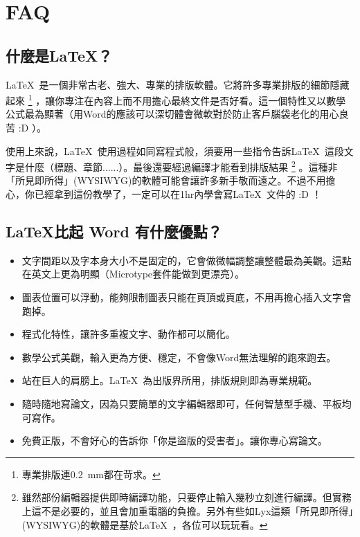 \documentclass[class=NCU_thesis, crop=false, float=true]{standalone}
\begin{document}
\let\orilabel\label %

\chapter{FAQ}
\label{sec:c_faq}
\section{什麼是\LaTeX ？}
\LaTeX\  是一個非常古老、強大、專業的排版軟體。它將許多專業排版的細節隱藏起來
\footnote{專業排版連\SI{0.2}{\milli\metre}都在苛求。}
，讓你專注在內容上而不用擔心最終文件是否好看。這一個特性又以數學公式最為顯著（用Word的應該可以深切體會微軟對於防止客戶腦袋老化的用心良苦 :D ）。

使用上來說，\LaTeX\ 使用過程如同寫程式般，須要用一些指令告訴\LaTeX\ 這段文字是什麼（標題、章節......）。最後還要經過編譯才能看到排版結果
\footnote{雖然部份編輯器提供即時編譯功能，只要停止輸入幾秒立刻進行編譯。但實務上這不是必要的，並且會加重電腦的負擔。另外有些如Lyx這類「所見即所得」(WYSIWYG)的軟體是基於\LaTeX\ ，各位可以玩玩看。}
。這種非「所見即所得」(WYSIWYG)的軟體可能會讓許多新手敬而遠之。不過不用擔心，你已經拿到這份教學了，一定可以在1hr內學會寫\LaTeX\ 文件的 :D ！

\section{\LaTeX 比起 Word 有什麼優點？}
\begin{itemize}
    \item 文字間距以及字本身大小不是固定的，它會做微幅調整讓整體最為美觀。這點在英文上更為明顯（Microtype套件能做到更漂亮）。
    \item 圖表位置可以浮動，能夠限制圖表只能在頁頂或頁底，不用再擔心插入文字會跑掉。
    \item 程式化特性，讓許多重複文字、動作都可以簡化。
    \item 數學公式美觀，輸入更為方便、穩定，不會像Word無法理解的跑來跑去。
    \item 站在巨人的肩膀上。\LaTeX\ 為出版界所用，排版規則即為專業規範。
    \item 隨時隨地寫論文，因為只要簡單的文字編輯器即可，任何智慧型手機、平板均可寫作。
    \item 免費正版，不會好心的告訴你「你是盜版的受害者」。讓你專心寫論文。
\end{itemize}
\end{document}
